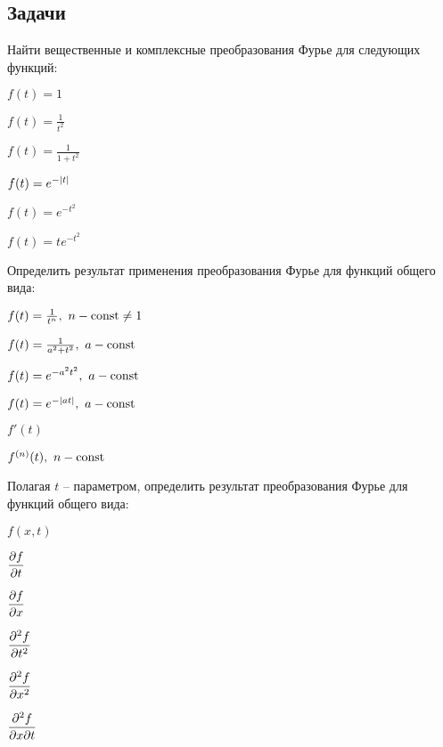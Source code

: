 \subsection{Задачи}

	Найти вещественные и комплексные преобразования Фурье для следующих функций:

	\begin{multicols}{3}
		\begin{enumtasks}

			\item \( f(t) = 1 \)
			\item \( f(t) = \frac{1}{t^2} \)
			\item \( f(t) = \frac{1}{1+t^2} \)
			\item \( f(t) = e^{-\left\vert t \right\vert} \)
			\item \( f(t) = e^{-t^2} \)
			\item \( f(t) = t e^{-t^2} \)

		\end{enumtasks}
	\end{multicols}

	\vspace{15pt}
	Определить результат применения преобразования Фурье для функций общего вида:

	\begin{multicols}{3}
		\begin{enumtasks}

			\item \( f(t) = \frac{1}{t^n}, ~ n - \mathrm{const} \neq 1 \)
			\item \( f(t) = \frac{1}{a^2 + t^2}, ~ a - \mathrm{const} \)
			\item \( f(t) = e^{-a^2 t^2}, ~ a - \mathrm{const} \)
			\item \( f(t) = e^{-\left\vert at \right\vert}, ~ a - \mathrm{const} \)
			\item \( f'(t) \)
			\item \( f^{(n)}(t), ~ n - \mathrm{const} \)

		\end{enumtasks}
	\end{multicols}

	\vspace{15pt}
	Полагая $t$ -- параметром, определить результат преобразования Фурье для функций общего вида:

	\begin{multicols}{6}
		\begin{enumtasks}

			\item \( f(x, t) \)
			\item \( \dfrac{\partial f}{\partial t} \)
			\item \( \dfrac{\partial f}{\partial x} \)
			\item \( \dfrac{\partial^{2} f}{\partial t^{2}} \)
			\item \( \dfrac{\partial^{2} f}{\partial x^{2}} \)
			\item \( \dfrac{\partial^2 f}{\partial x \partial t} \)

		\end{enumtasks}
	\end{multicols}

